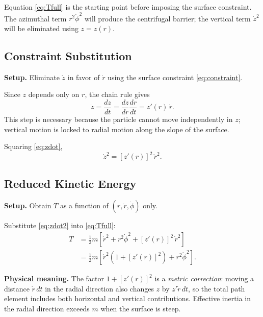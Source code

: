 \documentclass[11pt,letterpaper]{article}
\newcommand{\parhead}[1]{\par\medskip\noindent\textbf{#1}\ignorespaces}
\begin{document}
\begin{summarybox}
Equation \eqref{eq:Tfull} is the starting point before imposing the surface constraint. The azimuthal term $r^2\dot{\phi}^2$ will produce the centrifugal barrier; the vertical term $\dot{z}^2$ will be eliminated using $z=z(r)$.
\end{summarybox}

\subsection{Constraint Substitution}
\label{sec:constraint}

\parhead{Setup.}
Eliminate $\dot{z}$ in favor of $\dot{r}$ using the surface constraint \eqref{eq:constraint}.

Since $z$ depends only on $r$, the chain rule gives
\begin{equation}\label{eq:zdot}
    \dot{z} = \frac{dz}{dt} = \frac{dz}{dr}\frac{dr}{dt} = z'(r)\,\dot{r}.
\end{equation}
This step is necessary because the particle cannot move independently in $z$; vertical motion is locked to radial motion along the slope of the surface.

Squaring \eqref{eq:zdot},
\begin{equation}\label{eq:zdot2}
    \dot{z}^2 = [z'(r)]^2\,\dot{r}^2.
\end{equation}

\subsection{Reduced Kinetic Energy}
\label{sec:reducedT}

\parhead{Setup.}
Obtain $T$ as a function of $(r,\dot{r},\dot{\phi})$ only.

Substitute \eqref{eq:zdot2} into \eqref{eq:Tfull}:
\begin{align}
    T
    &= \frac{1}{2}m\left[\dot{r}^2 + r^2\dot{\phi}^2 + [z'(r)]^2\,\dot{r}^2\right] \nonumber \\
    &= \frac{1}{2}m\left[\dot{r}^2\left(1 + [z'(r)]^2\right) + r^2\dot{\phi}^2\right].
    \label{eq:Treduced}
\end{align}

\parhead{Physical meaning.}
The factor $1+[z'(r)]^2$ is a \emph{metric correction}: moving a distance $\dot{r}\,dt$ in the radial direction also changes $z$ by $z'\dot{r}\,dt$, so the total path element includes both horizontal and vertical contributions. Effective inertia in the radial direction exceeds $m$ when the surface is steep.
\end{document}

